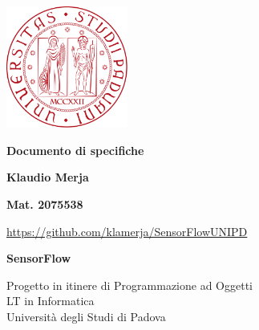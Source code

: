 \documentclass[a4paper, 10pt]{article}
\begin{document}
    \begin{titlepage}
        \begin{center}
            \includegraphics[width=0.3\textwidth]{./assets/LogoUNIPD.png}\\

            \vspace*{1cm}

            \Huge
            \textbf{Documento di specifiche}

            \vspace{1cm}

            \LARGE
            \textbf{Klaudio Merja}

            \vspace{0.2cm}

            \large
            \textbf{Mat. 2075538}

            \vspace{0.2cm}

            \url{https://github.com/klamerja/SensorFlowUNIPD}

            \vspace{1.5cm}

            \tableofcontents
            \vfill

            \LARGE
            \textbf{SensorFlow}

            \normalsize
            \vspace{0.8cm}
            Progetto in itinere di Programmazione ad Oggetti\\
            LT in Informatica\\
            Università degli Studi di Padova
        \end{center}
    \end{titlepage}
\end{document}

